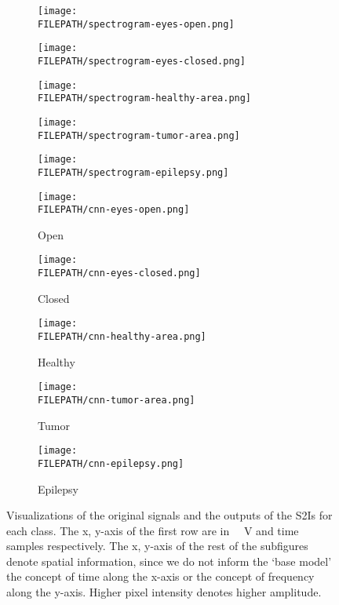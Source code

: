 \documentclass[conference]{IEEEtran}
\providecommand{\FILEPATH}{~/github.com/pbizopoulos/signal2image-modules-in-deep-neural-networks-for-eeg-classification/packages/python/tmp}
\begin{document}
\begin{figure*}[!t]
  \begin{subfigure}{0.19\linewidth}
    \centering
    \texttt{[image: \\FILEPATH/spectrogram-eyes-open.png]}
  \end{subfigure}
  \begin{subfigure}{0.19\linewidth}
    \centering
    \texttt{[image: \\FILEPATH/spectrogram-eyes-closed.png]}
  \end{subfigure}
  \begin{subfigure}{0.19\linewidth}
    \centering
    \texttt{[image: \\FILEPATH/spectrogram-healthy-area.png]}
  \end{subfigure}
  \begin{subfigure}{0.19\linewidth}
    \centering
    \texttt{[image: \\FILEPATH/spectrogram-tumor-area.png]}
  \end{subfigure}
  \begin{subfigure}{0.19\linewidth}
    \centering
    \texttt{[image: \\FILEPATH/spectrogram-epilepsy.png]}
  \end{subfigure}

  \begin{subfigure}{0.19\linewidth}
    \centering
    \texttt{[image: \\FILEPATH/cnn-eyes-open.png]}
    \caption{Open}
  \end{subfigure}
  \begin{subfigure}{0.19\linewidth}
    \centering
    \texttt{[image: \\FILEPATH/cnn-eyes-closed.png]}
    \caption{Closed}
  \end{subfigure}
  \begin{subfigure}{0.19\linewidth}
    \centering
    \texttt{[image: \\FILEPATH/cnn-healthy-area.png]}
    \caption{Healthy}
  \end{subfigure}
  \begin{subfigure}{0.19\linewidth}
    \centering
    \texttt{[image: \\FILEPATH/cnn-tumor-area.png]}
    \caption{Tumor}
  \end{subfigure}
  \begin{subfigure}{0.19\linewidth}
    \centering
    \texttt{[image: \\FILEPATH/cnn-epilepsy.png]}
    \caption{Epilepsy}
  \end{subfigure}
  \caption{Visualizations of the original signals and the outputs of the S2Is for each class.
    The x, y-axis of the first row are in \SI{}{\micro{} V} and time samples respectively.
    The x, y-axis of the rest of the subfigures denote spatial information, since we do not inform the `base model' the concept of time along the x-axis or the concept of frequency along the y-axis.
  Higher pixel intensity denotes higher amplitude.}\label{fig:signal2imageoutputs}
\end{figure*}
\end{document}
